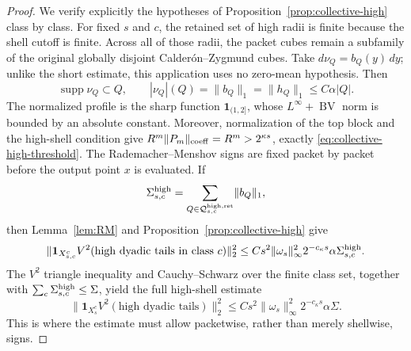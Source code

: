 \documentclass[11pt]{article}
\numberwithin{equation}{section}
\theoremstyle{remark}
\theoremstyle{definition}
\newcommand{\supp}{\operatorname{supp}}
\newcommand{\norm}[1]{\lVert #1\rVert}
\newcommand{\BV}{\operatorname{BV}}
\begin{document}
\begin{proof}
We verify explicitly the hypotheses of
Proposition~\ref{prop:collective-high} class by class.  For fixed $s$ and
$c$, the retained set of high radii is finite because the shell cutoff is
finite.  Across all of those radii, the packet cubes remain a subfamily of
the original globally disjoint Calder\'on--Zygmund cubes.  Take
$d\nu_Q=b_Q(y)\,dy$; unlike the short estimate, this application uses no
zero-mean hypothesis.  Then
\[
 \supp\nu_Q\subset Q,\qquad
 |\nu_Q|(Q)=\norm{b_Q}_1=\norm{h_Q}_1\le C\alpha|Q|.
\]
The normalized profile is the sharp function $\mathbf1_{(1,2]}$, whose
$L^\infty+\BV$ norm is bounded by an absolute constant.  Moreover,
normalization of the top block and the high-shell condition give
$R^m\|P_m\|_{\rm coeff}=R^m>2^{\kappa s}$, exactly
\eqref{eq:collective-high-threshold}.  The Rademacher--Menshov signs are
fixed packet by packet before the output point $x$ is evaluated.  If
\[
 \Sigma_{s,c}^{\rm high}
 =\sum_{Q\in\mathcal Q_{s,c}^{\rm high,ret}}\norm{b_Q}_1,
\]
then Lemma~\ref{lem:RM} and Proposition~\ref{prop:collective-high} give
\[
 \norm{\mathbf1_{X_{s,c}^c}
 V^2(\text{high dyadic tails in class }c)}_2^2
 \le Cs^2\norm{\omega_s}_\infty^2
 2^{-c_\kappa s}\alpha\Sigma_{s,c}^{\rm high}.
\]
The $V^2$ triangle inequality and Cauchy--Schwarz over the finite class set,
together with $\sum_c\Sigma_{s,c}^{\rm high}\le\Sigma$, yield the full
high-shell estimate
\begin{equation}\label{eq:far-high-long}
 \norm{\mathbf1_{X_s^c}V^2(\text{high dyadic tails})}_2^2
 \le Cs^2\norm{\omega_s}_\infty^2
 2^{-c_\kappa s}\alpha\Sigma.
\end{equation}
This is where the estimate must allow packetwise, rather than merely
shellwise, signs.


\end{proof}
\end{document}
